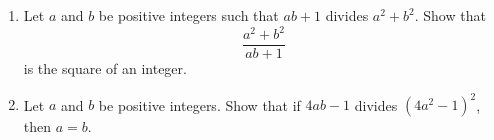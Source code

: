 \begin{problem}
    \begin{enumerate}
        \item[(a)] Let \( a \) and \( b \) be positive integers such that \( ab + 1 \) divides \( a^{2} + b^{2} \). Show that
            \[ \frac{a^{2} + b^{2}}{ab + 1} \]
            is the square of an integer.
        \item[(b)] Let \( a \) and \( b \) be positive integers. Show that if \( 4ab - 1 \) divides \( \left(4a^{2} - 1\right)^{2} \), then \( a = b \).
    \end{enumerate}
\end{problem}
